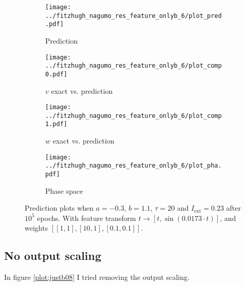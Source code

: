 \documentclass[a4paper]{article}
\begin{document}
\begin{figure}[H]
	\centering 
	\begin{subfigure}[b]{0.47\textwidth}
		\centering
		\texttt{[image: ../fitzhugh\_nagumo\_res\_feature\_onlyb\_6/plot\_pred.pdf]}
		\caption{Prediction}
		\label{fig:justb07a}
	\end{subfigure}
	\begin{subfigure}[b]{0.47\textwidth}
		\centering
		\texttt{[image: ../fitzhugh\_nagumo\_res\_feature\_onlyb\_6/plot\_comp0.pdf]}
		\caption{$v$ exact vs. prediction}
		\label{fig:justb07b}
	\end{subfigure}
	\begin{subfigure}[b]{0.47\textwidth}
		\centering
		\texttt{[image: ../fitzhugh\_nagumo\_res\_feature\_onlyb\_6/plot\_comp1.pdf]}
		\caption{$w$ exact vs. prediction}
		\label{fig:justb07c}
	\end{subfigure}
	\begin{subfigure}[b]{0.47\textwidth}
		\centering
		\texttt{[image: ../fitzhugh\_nagumo\_res\_feature\_onlyb\_6/plot\_pha.pdf]}
		\caption{Phase space}
		\label{fig:justb07d}
	\end{subfigure}
	\caption{Prediction plots when $a=-0.3$, $b=1.1$, $\tau=20$ and $ I_{\text{ext}}=0.23$ after $10^5$ epochs. With feature transform $t \rightarrow \left[ t, \sin(0.0173\cdot t) \right] $, and weights $\left[ \left[ 1, 1\right], \left[ 10, 1\right], \left[ 0.1, 0.1 \right]\right]$.}
	\label{plot:justb07}
\end{figure} 	


\subsection{No output scaling}

In figure \ref{plot:justb08} I tried removing the output scaling.
\end{document}
